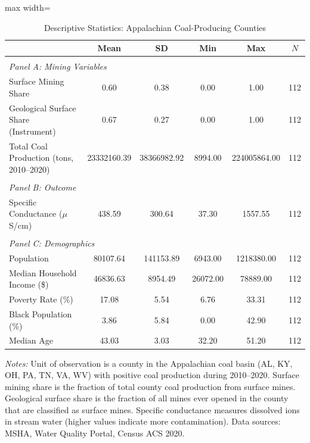 \begin{table}[t]
\centering
\footnotesize
\caption{Descriptive Statistics: Appalachian Coal-Producing Counties}
\label{tab:desc}
\begin{adjustbox}{max width=\textwidth}
\begin{tabular}{lccccc}
\hline\hline
 & Mean & SD & Min & Max & $N$ \\
\hline
\\[-1.8ex]
\multicolumn{6}{l}{\textit{Panel A: Mining Variables}} \\
Surface Mining Share & 0.60 & 0.38 & 0.00 & 1.00 & 112 \\
Geological Surface Share (Instrument) & 0.67 & 0.27 & 0.00 & 1.00 & 112 \\
Total Coal Production (tons, 2010--2020) & 23332160.39 & 38366982.92 & 8994.00 & 224005864.00 & 112 \\
\\[-1.0ex]
\multicolumn{6}{l}{\textit{Panel B: Outcome}} \\
Specific Conductance ($\mu$S/cm) & 438.59 & 300.64 & 37.30 & 1557.55 & 112 \\
\\[-1.0ex]
\multicolumn{6}{l}{\textit{Panel C: Demographics}} \\
Population & 80107.64 & 141153.89 & 6943.00 & 1218380.00 & 112 \\
Median Household Income (\$) & 46836.63 & 8954.49 & 26072.00 & 78889.00 & 112 \\
Poverty Rate (\%) & 17.08 & 5.54 & 6.76 & 33.31 & 112 \\
Black Population (\%) & 3.86 & 5.84 & 0.00 & 42.90 & 112 \\
Median Age & 43.03 & 3.03 & 32.20 & 51.20 & 112 \\
\hline\hline
\end{tabular}
\end{adjustbox}
\begin{tablenotes}
\item \textit{Notes:} Unit of observation is a county in the Appalachian coal basin (AL, KY, OH, PA, TN, VA, WV) with positive coal production during 2010--2020. Surface mining share is the fraction of total county coal production from surface mines. Geological surface share is the fraction of all mines ever opened in the county that are classified as surface mines. Specific conductance measures dissolved ions in stream water (higher values indicate more contamination). Data sources: MSHA, Water Quality Portal, Census ACS 2020.
\end{tablenotes}
\end{table}


